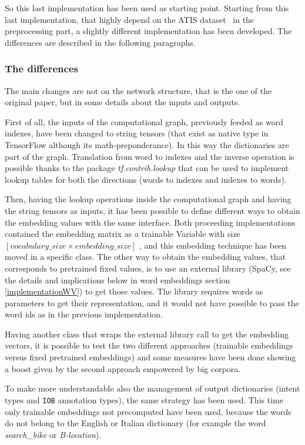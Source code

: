 So this last implementation has been used as starting point. Starting from this last implementation, that highly depend on the ATIS dataset~\cite{hemphill1990atis} in the preprocessing part, a slightly different implementation has been developed. The differences are described in the following paragraphs.

\subsubsection{The differences}
The main changes are not on the network structure, that is the one of the original paper, but in some details about the inputs and outputs.

First of all, the inputs of the computational graph, previously feeded as word indexes, have been changed to string tensors (that exist as native type in TensorFlow although its math-preponderance). In this way the dictionaries are part of the graph. Translation from word to indexes and the inverse operation is possible thanks to the package \textit{tf.contrib.lookup} that can be used to implement lookup tables for both the directions (words to indexes and indexes to words).

Then, having the lookup operations inside the computational graph and having the string tensors as inputs, it has been possible to define different ways to obtain the embedding values with the same interface. Both proceeding implementations contained the embedding matrix as a trainable Variable with size  \(  \left[ vocabulary \_ size  \times  embedding \_ size \right]  \) , and this embedding technique has been moved in a specific class. The other way to obtain the embedding values, that corresponds to pretrained fixed values, is to use an external library (SpaCy, see the details and implications below in word embeddings section \ref{implementationWV}) to get those values. The library requires words as parameters to get their representation, and it would not have possible to pass the word ids as in the previous implementation.

Having another class that wraps the external library call to get the embedding vectors, it is possible to test the two different approaches (trainable embeddings versus fixed pretrained embeddings) and some measures have been done showing a boost given by the second approach empowered by big corpora.

To make more understandable also the management of output dictionaries (intent types and \texttt{IOB} annotation types), the same strategy has been used. This time only trainable embeddings not precomputed have been used, because the words do not belong to the English or Italian dictionary (for example the word \textit{search\_bike} or \textit{B-location}).

